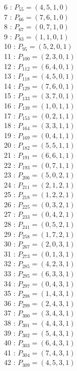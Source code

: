\documentclass{article}
\begin{document}
{\begin{multicols}{3}
6 : $P_{55}=( 4, 5, 1, 0 )$\\
7 : $P_{66}=( 7, 6, 1, 0 )$\\
8 : $P_{67}=( 0, 7, 1, 0 )$\\
9 : $P_{83}=( 1, 1, 0, 1 )$\\
10 : $P_{95}=( 5, 2, 0, 1 )$\\
11 : $P_{100}=( 2, 3, 0, 1 )$\\
12 : $P_{112}=( 6, 4, 0, 1 )$\\
13 : $P_{118}=( 4, 5, 0, 1 )$\\
14 : $P_{129}=( 7, 6, 0, 1 )$\\
15 : $P_{133}=( 3, 7, 0, 1 )$\\
16 : $P_{139}=( 1, 0, 1, 1 )$\\
17 : $P_{153}=( 0, 2, 1, 1 )$\\
18 : $P_{164}=( 3, 3, 1, 1 )$\\
19 : $P_{169}=( 0, 4, 1, 1 )$\\
20 : $P_{182}=( 5, 5, 1, 1 )$\\
21 : $P_{191}=( 6, 6, 1, 1 )$\\
22 : $P_{193}=( 0, 7, 1, 1 )$\\
23 : $P_{206}=( 5, 0, 2, 1 )$\\
24 : $P_{211}=( 2, 1, 2, 1 )$\\
25 : $P_{218}=( 1, 2, 2, 1 )$\\
26 : $P_{225}=( 0, 3, 2, 1 )$\\
27 : $P_{233}=( 0, 4, 2, 1 )$\\
28 : $P_{241}=( 0, 5, 2, 1 )$\\
29 : $P_{258}=( 1, 7, 2, 1 )$\\
30 : $P_{267}=( 2, 0, 3, 1 )$\\
31 : $P_{273}=( 0, 1, 3, 1 )$\\
32 : $P_{285}=( 4, 2, 3, 1 )$\\
33 : $P_{295}=( 6, 3, 3, 1 )$\\
34 : $P_{297}=( 0, 4, 3, 1 )$\\
35 : $P_{298}=( 1, 4, 3, 1 )$\\
36 : $P_{299}=( 2, 4, 3, 1 )$\\
37 : $P_{300}=( 3, 4, 3, 1 )$\\
38 : $P_{301}=( 4, 4, 3, 1 )$\\
39 : $P_{302}=( 5, 4, 3, 1 )$\\
40 : $P_{303}=( 6, 4, 3, 1 )$\\
41 : $P_{304}=( 7, 4, 3, 1 )$\\
42 : $P_{309}=( 4, 5, 3, 1 )$\\

\end{multicols}}
\end{document}
